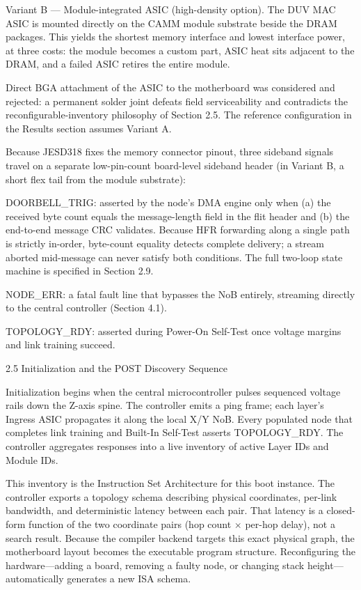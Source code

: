 \documentclass[10pt,twocolumn]{article}
\begin{document}
Variant B --- Module-integrated ASIC (high-density option). The DUV MAC ASIC is mounted directly on the CAMM module substrate beside the DRAM packages. This yields the shortest memory interface and lowest interface power, at three costs: the module becomes a custom part, ASIC heat sits adjacent to the DRAM, and a failed ASIC retires the entire module.

Direct BGA attachment of the ASIC to the motherboard was considered and rejected: a permanent solder joint defeats field serviceability and contradicts the reconfigurable-inventory philosophy of Section 2.5. The reference configuration in the Results section assumes Variant A.

Because JESD318 fixes the memory connector pinout, three sideband signals travel on a separate low-pin-count board-level sideband header (in Variant B, a short flex tail from the module substrate):

DOORBELL\_TRIG: asserted by the node's DMA engine only when (a) the received byte count equals the message-length field in the flit header and (b) the end-to-end message CRC validates. Because HFR forwarding along a single path is strictly in-order, byte-count equality detects complete delivery; a stream aborted mid-message can never satisfy both conditions. The full two-loop state machine is specified in Section 2.9.

NODE\_ERR: a fatal fault line that bypasses the NoB entirely, streaming directly to the central controller (Section 4.1).

TOPOLOGY\_RDY: asserted during Power-On Self-Test once voltage margins and link training succeed.

2.5 Initialization and the POST Discovery Sequence

Initialization begins when the central microcontroller pulses sequenced voltage rails down the Z-axis spine. The controller emits a ping frame; each layer's Ingress ASIC propagates it along the local X/Y NoB. Every populated node that completes link training and Built-In Self-Test asserts TOPOLOGY\_RDY. The controller aggregates responses into a live inventory of active Layer IDs and Module IDs.

This inventory is the Instruction Set Architecture for this boot instance. The controller exports a topology schema describing physical coordinates, per-link bandwidth, and deterministic latency between each pair. That latency is a closed-form function of the two coordinate pairs (hop count $\times$ per-hop delay), not a search result. Because the compiler backend targets this exact physical graph, the motherboard layout becomes the executable program structure. Reconfiguring the hardware---adding a board, removing a faulty node, or changing stack height---automatically generates a new ISA schema.
\end{document}
